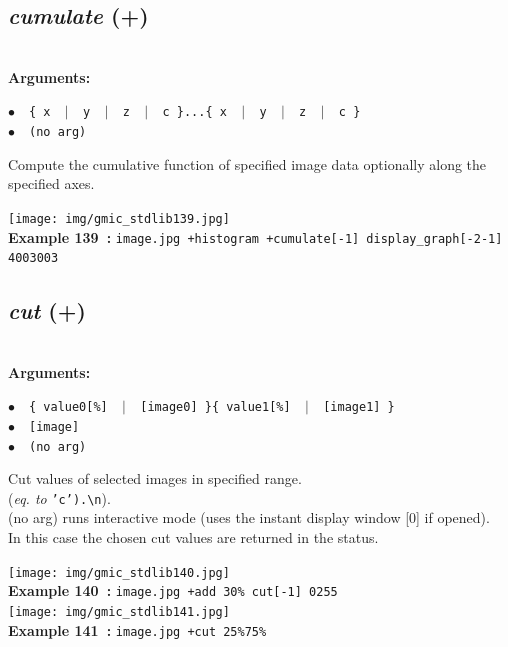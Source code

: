 \documentclass[a4paper,10.5pt,twoside]{book}
\def\comma{\discretionary{,}{}{,}}
\newcommand{\Cb}[1]{\textcolor{cb}{#1}}
\begin{document}
\subsection{\emph{cumulate} (+)}\vspace*{-0.7em}
~\\\textbf{\Cb{Arguments: }}\begin{flushleft}
{\small \Cb{\hspace*{0.5cm}$\bullet$~~\texttt{\{ x ~$|$~ y ~$|$~ z ~$|$~ c \}...\{ x ~$|$~ y ~$|$~ z ~$|$~ c \}}}}~~~\\
{\small \Cb{\hspace*{0.5cm}$\bullet$~~\texttt{(no arg)}}}\end{flushleft}
Compute the cumulative function of specified image data{\comma} optionally along the specified axes.
\begin{center}\texttt{[image: img/gmic\_stdlib139.jpg]}\\
{\footnotesize \textbf{Example 139~:} \texttt{image.jpg +histogram +cumulate[-1] display\_graph[-2{\comma}-1] 400{\comma}300{\comma}3}}
\end{center}

\subsection{\emph{cut} (+)}\vspace*{-0.7em}
~\\\textbf{\Cb{Arguments: }}\begin{flushleft}
{\small \Cb{\hspace*{0.5cm}$\bullet$~~\texttt{\{ value0[\%] ~$|$~ [image0] \}{\comma}\{ value1[\%] ~$|$~ [image1] \}}}}~~~\\
{\small \Cb{\hspace*{0.5cm}$\bullet$~~\texttt{[image]}}}~~~\\
{\small \Cb{\hspace*{0.5cm}$\bullet$~~\texttt{(no arg)}}}\end{flushleft}
Cut values of selected images in specified range.
~\\(\emph{eq. to} {\small \texttt{'c').\textbackslash n}}).
~\\(no arg) runs interactive mode (uses the instant display window [0] if opened).
~\\In this case{\comma} the chosen cut values are returned in the status.
\begin{center}\texttt{[image: img/gmic\_stdlib140.jpg]}\\
{\footnotesize \textbf{Example 140~:} \texttt{image.jpg +add 30\% cut[-1] 0{\comma}255}}
\\\texttt{[image: img/gmic\_stdlib141.jpg]}\\
{\footnotesize \textbf{Example 141~:} \texttt{image.jpg +cut 25\%{\comma}75\%}}
\end{center}
\end{document}
